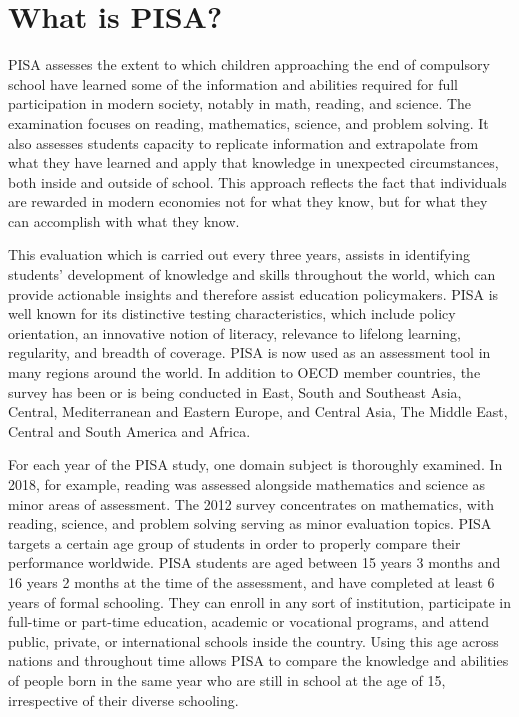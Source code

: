 \hypertarget{what-is-pisa}{%
\section{What is PISA?}\label{what-is-pisa}}

PISA assesses the extent to which children approaching the end of
compulsory school have learned some of the information and abilities
required for full participation in modern society, notably in math,
reading, and science. The examination focuses on reading, mathematics,
science, and problem solving. It also assesses students capacity to
replicate information and extrapolate from what they have learned and
apply that knowledge in unexpected circumstances, both inside and
outside of school. This approach reflects the fact that individuals are
rewarded in modern economies not for what they know, but for what they
can accomplish with what they know.

This evaluation which is carried out every three years, assists in
identifying students' development of knowledge and skills throughout the
world, which can provide actionable insights and therefore assist
education policymakers. PISA is well known for its distinctive testing
characteristics, which include policy orientation, an innovative notion
of literacy, relevance to lifelong learning, regularity, and breadth of
coverage. PISA is now used as an assessment tool in many regions around
the world. In addition to OECD member countries, the survey has been or
is being conducted in East, South and Southeast Asia, Central,
Mediterranean and Eastern Europe, and Central Asia, The Middle East,
Central and South America and Africa. \citep{pisabook}

For each year of the PISA study, one domain subject is thoroughly
examined. In 2018, for example, reading was assessed alongside
mathematics and science as minor areas of assessment. The 2012 survey
concentrates on mathematics, with reading, science, and problem solving
serving as minor evaluation topics. PISA targets a certain age group of
students in order to properly compare their performance worldwide. PISA
students are aged between 15 years 3 months and 16 years 2 months at the
time of the assessment, and have completed at least 6 years of formal
schooling. They can enroll in any sort of institution, participate in
full-time or part-time education, academic or vocational programs, and
attend public, private, or international schools inside the country.
Using this age across nations and throughout time allows PISA to compare
the knowledge and abilities of people born in the same year who are
still in school at the age of 15, irrespective of their diverse
schooling. \citep{pisabook}

